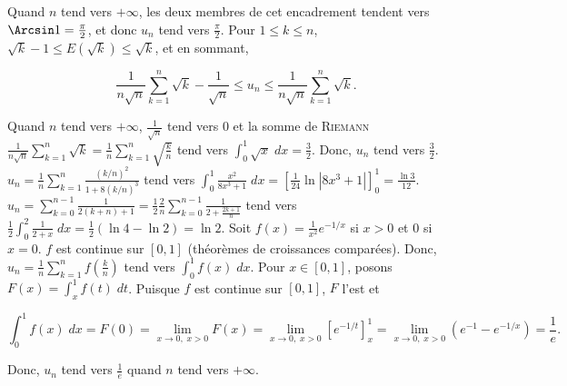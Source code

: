 {{Quand $n$ tend vers $+\infty$, les deux membres de cet encadrement tendent vers $\Arcsin1=\frac{\pi}{2}$, et donc $u_n$ tend vers $\frac{\pi}{2}$.
Pour $1\leq k\leq n$, $\sqrt{k}-1\leq E(\sqrt{k})\leq \sqrt{k}$, et en sommant,

$$\frac{1}{n\sqrt{n}}\sum_{k=1}^{n}\sqrt{k}-\frac{1}{\sqrt{n}}\leq u_n\leq \frac{1}{n\sqrt{n}}\sum_{k=1}^{n}\sqrt{k}.$$

Quand $n$ tend vers $+\infty$, $\frac{1}{\sqrt{n}}$ tend vers $0$ et la somme de \textsc{Riemann} $\frac{1}{n\sqrt{n}}\sum_{k=1}^{n}\sqrt{k}=\frac{1}{n}\sum_{k=1}^{n}\sqrt{\frac{k}{n}}$ tend vers $\int_{0}^{1}\sqrt{x}\;dx=\frac{3}{2}$. Donc, $u_n$ tend vers $\frac{3}{2}$.
$u_n=\frac{1}{n}\sum_{k=1}^{n}\frac{(k/n)^2}{1+8(k/n)^3}$ tend vers $\int_{0}^{1}\frac{x^2}{8x^3+1}\;dx=\left[\frac{1}{24}\ln|8x^3+1|\right]_{0}^{1}=\frac{\ln3}{12}$.
$u_n=\sum_{k=0}^{n-1}\frac{1}{2(k+n)+1}=\frac{1}{2}\frac{2}{n}\sum_{k=0}^{n-1}\frac{1}{2+\frac{2k+1}{n}}$ tend vers $\frac{1}{2}\int_{0}^{2}\frac{1}{2+x}\;dx=\frac{1}{2}(\ln4-\ln2)=\ln2$.
Soit $f(x)=\frac{1}{x^2}e^{-1/x}$ si $x>0$ et $0$ si $x=0$. $f$ est continue sur $[0,1]$ (théorèmes de croissances comparées). Donc, $u_n=\frac{1}{n}\sum_{k=1}^{n}f(\frac{k}{n})$ tend vers $\int_{0}^{1}f(x)\;dx$. Pour $x\in[0,1]$, posons $F(x)=\int_{x}^{1}f(t)\;dt$. Puisque $f$ est continue sur $[0,1]$, $F$ l'est et

$$\int_{0}^{1}f(x)\;dx=F(0)=\lim_{x\rightarrow 0,\;x>0}F(x)=\lim_{x\rightarrow 0,\;x>0}\left[e^{-1/t}\right]_{x}^{1}=\lim_{x\rightarrow 0,\;x>0}(e^{-1}-e^{-1/x})=\frac{1}{e}.$$

Donc, $u_n$ tend vers $\frac{1}{e}$ quand $n$ tend vers $+\infty$.
}
}
